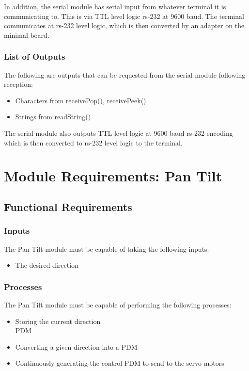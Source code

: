 \documentclass[]{report}
\begin{document}
In addition, the serial module has serial input from whatever terminal it is communicating to. This is via TTL level logic rs-232 at 9600 baud. The terminal communicates at rs-232 level logic, which is then converted by an adapter on the minimal board.

\subsubsection{List of Outputs}
The following are outputs that can be requested from the serial module following reception:
\begin{itemize}
	\item Characters from receivePop(), receivePeek()
	\item Strings from readString()
\end{itemize}

The serial module also outputs TTL level logic at 9600 baud rs-232 encoding which is then converted to rs-232 level logic to the terminal.



\section{Module Requirements: Pan Tilt}

\subsection{Functional Requirements}
\subsubsection{Inputs}
The Pan Tilt module must be capable of taking the following inputs:
\begin{itemize}
	\item The desired direction
\end{itemize}

\subsubsection{Processes}
The Pan Tilt module must be capable of performing the following processes:
\begin{itemize}
	\item Storing the current direction\\PDM
	\item Converting a given direction into a PDM
	\item Continuously generating the control PDM to send to the servo motors
\end{itemize}
\end{document}
